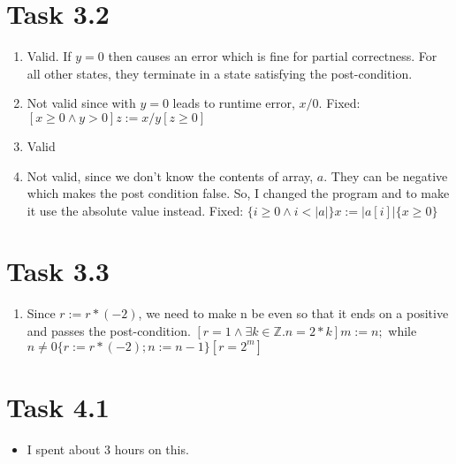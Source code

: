 \documentclass{article}
\newcommand{\Z}{\mathbb{Z}}
\newcommand{\answer}{\item[]} %
\begin{document}
	\section{Task 3.2}
		\begin{enumerate}[label = {(\alph*)}]
			
			\item Valid. If $y = 0$ then causes an error which is fine for partial correctness. For all other states, they terminate in a state satisfying the post-condition.
			
			\item Not valid since with $y = 0$ leads to runtime error, $x / 0$. Fixed: $[x \geq 0 \land y > 0] z:= x / y [z \geq 0]$
			
			\item Valid
			
			\item Not valid, since we don't know the contents of array, $a$. They can be negative which makes the post condition false. So, I changed the program and to make it use the absolute value instead. Fixed: $\{i \geq 0 \land i < |a|\} x := |a[i]| \{x \geq 0\}$
			
		\end{enumerate}
	
	\section{Task 3.3}
		\begin{enumerate}[label = {(\alph*)}]
			
			\answer Since $r := r * (-2)$, we need to make n be even so that it ends on a positive and passes the post-condition.
			$[r = 1 \land \exists k \in \Z . n = 2 * k] m := n;$ while $n \neq 0 \{r := r * (-2); n := n - 1\}[r = 2^m]$
		
		\end{enumerate}
	
	\section{Task 4.1}
		\begin{itemize}
			
			\answer I spent about 3 hours on this.
			
		\end{itemize}
	
\end{document}
